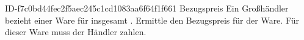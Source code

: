 \begin{exercise}
      {ID-f7c0bd44fec2f5aec245c1cd1083aa6f64f1f661}
      {Bezugspreis}
  \ifproblem\problem
    Ein Großhändler bezieht  einer Ware für insgesamt .
    Ermittle den Bezugspreis für  der Ware.
  \fi
  \ifoutcome\outcome
    Für  dieser Ware muss der Händler  zahlen.
  \fi
\end{exercise}

